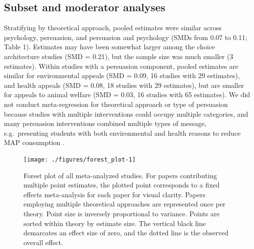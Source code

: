 \documentclass[preprint, 3p,
authoryear]{elsarticle} %
\begin{document}
\subsection{Subset and moderator analyses}\label{Sec3.3}

Stratifying by theoretical approach, pooled estimates were similar
across psychology, persuasion, and persuasion and psychology (SMDs from
0.07 to 0.11; Table 1). Estimates may have been somewhat larger among
the choice architecture studies (SMD = 0.21), but the sample size was
much smaller (3 estimates). Within studies with a persuasion component,
pooled estimates are similar for environmental appeals (SMD = 0.09, 16
studies with 29 estimates), and health appeals (SMD = 0.08, 18 studies
with 29 estimates), but are smaller for appeals to animal welfare (SMD =
0.03, 16 studies with 65 estimates). We did not conduct meta-regression
for theoretical approach or type of persuasion because studies with
multiple interventions could occupy multiple categories, and many
persuasion interventions combined multiple types of message,
e.g.~presenting students with both environmental and health reasons to
reduce MAP consumption \citep{jalil2023}.

\begin{figure}[H]

{\centering \texttt{[image: ./figures/forest\_plot-1]} 

}

\caption{Forest plot of all meta-analyzed studies. For papers contributing multiple point estimates, the plotted point corresponds to a fixed effects meta-analysis for each paper for visual clarity. Papers employing multiple theoretical approaches are represented once per theory. Point size is inversely proportional to variance. Points are sorted within theory by estimate size. The vertical black line demarcates an effect size of zero, and the dotted line is the observed overall effect.}\label{fig:forest_plot}
\end{figure}
\end{document}

